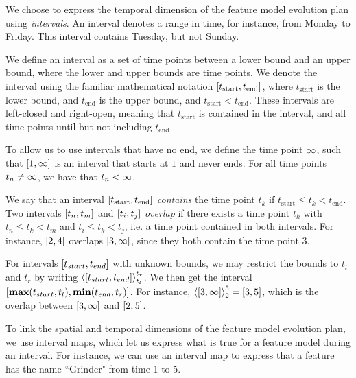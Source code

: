 We choose to express the temporal dimension of the feature model evolution plan using \emph{intervals}. An interval denotes a range in time, for instance, from Monday to Friday. This interval contains Tuesday, but not Sunday.
\\
\begin{definition}[Interval]
  We define an interval as a set of time points between a lower bound and an upper bound, where the lower and upper bounds are time points. We denote the interval using the familiar mathematical notation $\interval{t_\text{start}}{t_\text{end}}$, where $t_\text{start}$ is the lower bound, and $t_\text{end}$ is the upper bound, and $t_\text{start} < t_\text{end}$. These intervals are left-closed and right-open, meaning that $t_\text{start}$ is contained in the interval, and all time points until but not including $t_\text{end}$.
  \label{def:interval}
\end{definition}

To allow us to use intervals that have no end, we define the time point $\infty$, such that $\interval{1}{\forever}$ is an interval that starts at $1$ and never ends. For all time points $t_n \neq \infty$, we have that $t_n < \infty$. 

We say that an interval $\interval{t_\text{start}}{t_\text{end}}$ \emph{contains} the time point $t_k$ if $t_\text{start} \leq t_k < t_\text{end}$. Two intervals $\interval{t_n}{t_m}$ and $\interval{t_i}{t_j}$ \emph{overlap} if there exists a time point $t_k$ with $t_n \leq t_k < t_m$ and $t_i \leq t_k < t_j$, i.e. a time point contained in both intervals. For instance, $\interval{2}{4}$ overlaps $\interval{3}{\forever}$, since they both contain the time point 3.

For intervals $\interval{t_{start}}{t_{end}}$ with unknown bounds, we may restrict the bounds to $t_l$ and $t_r$ by writing $\clamp{\interval{t_{start}}{t_{end}}}{t_l}{t_r}$. We then get the interval $\interval{\textbf{max}(t_{start}, t_l)}{\textbf{min}(t_{end}, t_r)}$. For instance, $\clamp{\interval{3}{\forever}}{2}{5} = \interval{3}{5}$, which is the overlap between $\interval{3}{\forever}$ and $\interval{2}{5}$.


To link the spatial and temporal dimensions of the feature model evolution plan, we use interval maps, which let us express what is true for a feature model during an interval. For instance, we can use an interval map to express that a feature has the name ``Grinder" from time 1 to 5.
\\

